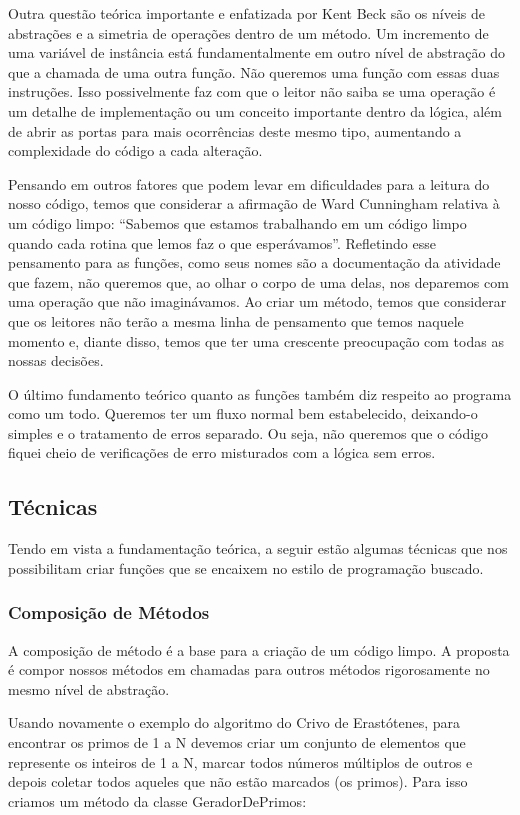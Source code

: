 	Outra questão teórica importante e enfatizada por Kent Beck são os níveis de abstrações e a simetria de operações dentro de um método. Um incremento de uma variável de instância está fundamentalmente em outro nível de abstração do que a chamada de uma outra função. Não queremos uma função com essas duas instruções. Isso possivelmente faz com que o leitor não saiba se uma operação é um detalhe de implementação ou um conceito importante dentro da lógica, além de abrir as portas para mais ocorrências deste mesmo tipo, aumentando a complexidade do código a cada alteração.
	
	Pensando em outros fatores que podem levar em dificuldades para a leitura do nosso código, temos que considerar a afirmação de Ward Cunningham relativa à um código limpo: “Sabemos que estamos trabalhando em um código limpo quando cada rotina que lemos faz o que esperávamos”. Refletindo esse pensamento para as funções, como seus nomes são a documentação da atividade que fazem, não queremos que, ao olhar o corpo de uma delas, nos deparemos com uma operação que não imaginávamos. Ao criar um método, temos que considerar que os leitores não terão a mesma linha de pensamento que temos naquele momento e, diante disso, temos que ter uma crescente preocupação com todas as nossas decisões.
	
	O último fundamento teórico quanto as funções também diz respeito ao programa como um todo. Queremos ter um fluxo normal bem estabelecido, deixando-o simples e o tratamento de erros separado. Ou seja, não queremos que o código fiquei cheio de verificações de erro misturados com a lógica sem erros.
	
\subsection{Técnicas}
	Tendo em vista a fundamentação teórica, a seguir estão algumas técnicas que nos possibilitam criar funções que se encaixem no estilo de programação buscado.

\subsubsection{Composição de Métodos}
	A composição de método é a base para a criação de um código limpo. A proposta é compor nossos métodos em chamadas para outros métodos rigorosamente no mesmo nível de abstração.
	
	Usando novamente o exemplo do algoritmo do Crivo de Erastótenes, para encontrar os primos de 1 a N devemos criar um conjunto de elementos que represente os inteiros de 1 a N, marcar todos números múltiplos de outros e depois coletar todos aqueles que não estão marcados (os primos). Para isso criamos um método da classe GeradorDePrimos:

